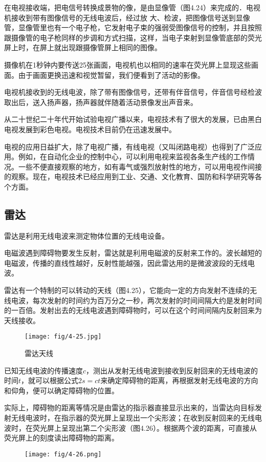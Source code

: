 在电视接收端，把电信号转换成景物的像，是由显像管（图4.24）来完成的．电视机接收到带有图像信号的无线电波后，经过放
大、检波，把图像信号送到显像管，显像管里也有一个电子枪，它发射电子束的强弱受图像信号的控制，并且按照跟摄像管的电子枪同样的步调和方式扫描，这样，当电子束射到显像管底部的荧光屏上时，在屏上就出现跟摄像管屏上相同的图像。

摄像机在1秒钟内要传送25张画面，电视机也以相同的速率在荧光屏上显现这些画面。由于画面更换迅速和视觉暂留，我们便看到了活动的影像。

电视机接收到的无线电波，除了带有图像信号，还带有伴音信号，伴音信号经检波取出后，送入扬声器，扬声器就伴随着活动景像发出声音来。

从二十世纪二十年代开始试验电视广播以来，电视技术有了很大的发展，已由黑白电视发展到彩色电视。电视技术目前仍在迅速发展中。

电视的应用日益扩大，除了电视广播，有线电视（又叫闭路电视）也得到了广泛应用。例如，在自动化企业的控制中心，可以利用电视来监视各条生产线的工作情况。一些不便直接观察的地方，如有毒气或强烈放射性的地方，可以用电视作间接的观察。现在，电视技术已经应用到工业、交通、文化教育、国防和科学研究等各个方面。

\subsection{雷达}

雷达是利用无线电波来测定物体位置的无线电设备。

电磁波遇到障碍物要发生反射，雷达就是利用电磁波的反射来工作的。波长越短的电磁波，传播的直线性越好，反射性能越强，因此雷达用的是微波波段的无线电波。

雷达有一个特制的可以转动的天线（图4.25），它能向一定的方向发射不连续的无线电波，每次发射的时间约为百万分之一秒，两次发射的时间间隔大约是发射时间的一百倍。发射出去的无线电波遇到障碍物时，可以在这个时间间隔内反射回来为天线接收。
\begin{figure}[htp]\centering
	\texttt{[image: fig/4-25.jpg]}
	\caption{雷达天线}
	\end{figure}

已知无线电波的传播速度$c$，测出从发射无线电波到接收到反射回来的无线电波的时间$t$，就可以根据公式$2s=ct$来确定障碍物的距离，再根据发射无线电波的方向和仰角，便可以确定障碍物的位置。

实际上，障碍物的距离等情况是由雷达的指示器直接显示出来的，当雷达向目标发射无线电波时，在指示器的荧光屏上呈现出一个尖形波；在收到反射回来的无线电波时，在荧光屏上呈现出第二个尖形波（图4.26）。根据两个波的距离，可直接从荧光屏上的刻度读出障碍物的距离。
\begin{figure}[htp]\centering
	\texttt{[image: fig/4-26.png]}
	\caption{}
	\end{figure}

